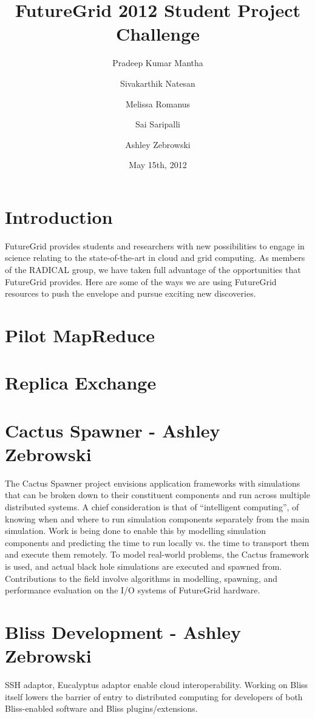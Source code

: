 \documentclass[]{paper}
\begin{document}
\title{FutureGrid 2012 Student Project Challenge} 
\author{Pradeep Kumar Mantha 
  \and Sivakarthik Natesan 
  \and Melissa Romanus 
  \and Sai Saripalli 
  \and Ashley Zebrowski
}
\date{May 15th, 2012}
\maketitle

\begin{abstract}
\end{abstract}

\section{Introduction}
FutureGrid provides students and researchers with new possibilities to
engage in science relating to the state-of-the-art in cloud and grid computing.
As members of the RADICAL group, we have taken full advantage
of the opportunities that FutureGrid provides.  Here are some of the ways
we are using FutureGrid resources to push the envelope and pursue exciting
new discoveries.
\section{Pilot MapReduce}
\section{Replica Exchange}

\section{Cactus Spawner - Ashley Zebrowski}
The Cactus Spawner project envisions application frameworks with simulations that
can be broken down to their constituent components and run across multiple
distributed systems.  A chief consideration is that of ``intelligent computing'',
of knowing when and where to run simulation components separately from the main
simulation.  Work is being done to enable this by modelling simulation components
and predicting the time to run locally vs. the time to transport them and execute
them remotely.  To model real-world problems, the Cactus framework is used, and
actual black hole simulations are executed and spawned from.  Contributions
to the field involve algorithms in modelling, spawning, and performance evaluation on
the I/O systems of FutureGrid hardware.

\section{Bliss Development - Ashley Zebrowski}
SSH adaptor, Eucalyptus adaptor enable cloud interoperability.  Working on 
Bliss itself lowers the barrier of entry to distributed computing for developers
of both Bliss-enabled software and Bliss plugins/extensions.
\end{document}
